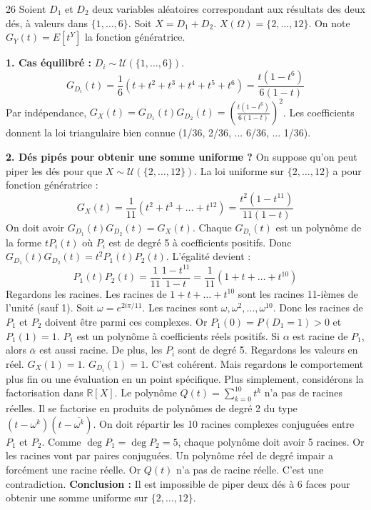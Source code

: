 \begin{correction}{26}
Soient $D_1$ et $D_2$ deux variables aléatoires correspondant aux résultats des deux dés, à valeurs dans $\{1, \dots, 6\}$.
Soit $X = D_1 + D_2$. $X(\Omega) = \{2, \dots, 12\}$.
On note $G_Y(t) = E[t^Y]$ la fonction génératrice.

\textbf{1. Cas équilibré :}
$D_i \sim \mathcal{U}(\{1, \dots, 6\})$.
$$ G_{D_i}(t) = \frac{1}{6}(t + t^2 + t^3 + t^4 + t^5 + t^6) = \frac{t(1-t^6)}{6(1-t)} $$
Par indépendance, $G_X(t) = G_{D_1}(t) G_{D_2}(t) = \left( \frac{t(1-t^6)}{6(1-t)} \right)^2$.
Les coefficients donnent la loi triangulaire bien connue (1/36, 2/36, ... 6/36, ... 1/36).

\textbf{2. Dés pipés pour obtenir une somme uniforme ?}
On suppose qu'on peut piper les dés pour que $X \sim \mathcal{U}(\{2, \dots, 12\})$.
La loi uniforme sur $\{2, \dots, 12\}$ a pour fonction génératrice :
$$ G_X(t) = \frac{1}{11} (t^2 + t^3 + \dots + t^{12}) = \frac{t^2(1-t^{11})}{11(1-t)} $$
On doit avoir $G_{D_1}(t) G_{D_2}(t) = G_X(t)$.
Chaque $G_{D_i}(t)$ est un polynôme de la forme $t P_i(t)$ où $P_i$ est de degré 5 à coefficients positifs.
Donc $G_{D_1}(t) G_{D_2}(t) = t^2 P_1(t) P_2(t)$.
L'égalité devient :
$$ P_1(t) P_2(t) = \frac{1}{11} \frac{1-t^{11}}{1-t} = \frac{1}{11} (1 + t + \dots + t^{10}) $$
Regardons les racines.
Les racines de $1 + t + \dots + t^{10}$ sont les racines 11-ièmes de l'unité (sauf 1).
Soit $\omega = e^{2i\pi/11}$. Les racines sont $\omega, \omega^2, \dots, \omega^{10}$.
Donc les racines de $P_1$ et $P_2$ doivent être parmi ces complexes.
Or $P_1(0) = P(D_1=1) > 0$ et $P_1(1) = 1$.
$P_1$ est un polynôme à coefficients réels positifs.
Si $\alpha$ est racine de $P_1$, alors $\overline{\alpha}$ est aussi racine.
De plus, les $P_i$ sont de degré 5.
Regardons les valeurs en réel.
$G_X(1) = 1$. $G_{D_i}(1) = 1$. C'est cohérent.
Mais regardons le comportement plus fin ou une évaluation en un point spécifique.
Plus simplement, considérons la factorisation dans $\mathbb{R}[X]$.
Le polynôme $Q(t) = \sum_{k=0}^{10} t^k$ n'a pas de racines réelles.
Il se factorise en produits de polynômes de degré 2 du type $(t-\omega^k)(t-\overline{\omega^k})$.
On doit répartir les 10 racines complexes conjuguées entre $P_1$ et $P_2$.
Comme $\deg P_1 = \deg P_2 = 5$, chaque polynôme doit avoir 5 racines.
Or les racines vont par paires conjuguées. Un polynôme réel de degré impair a forcément une racine réelle.
Or $Q(t)$ n'a pas de racine réelle.
C'est une contradiction.
\textbf{Conclusion :} Il est impossible de piper deux dés à 6 faces pour obtenir une somme uniforme sur $\{2, \dots, 12\}$.
\end{correction}

